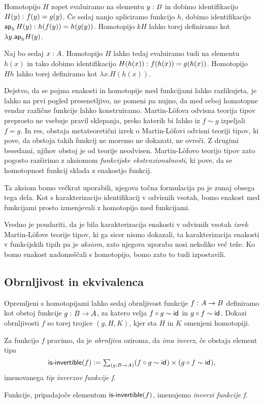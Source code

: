 \begin{dokaz}
  Homotopijo \(H\) zopet evaluiramo na elementu \(y : B\) in dobimo
  identifikacijo \(H(y) \,\colon f(y) = g(y)\). Če sedaj nanjo apliciramo funkcijo \(h\),
  dobimo identifikacijo \(\textnormal{\textsf{ap}}_{h}\,H(y) \,\colon h(f(y)) = h(g(y))\). Homotopijo \(kH\) lahko
  torej definiramo kot
  \(\lambda y. \textnormal{\textsf{ap}}_{h}H(y)\).

  Naj bo sedaj \(x : A\). Homotopijo \(H\) lahko tedaj evaluiramo tudi
  na elementu \(h(x)\) in tako dobimo identifikacijo
  \(H(h(x)) \,\colon f(h(x)) = g(h(x))\). Homotopijo \(Hh\) lahko torej definiramo kot
  \(\lambda x.H(h(x))\).
\end{dokaz}

Dejstvo, da se pojma enakosti in homotopije med funkcijami lahko razlikujeta, je lahko na prvi pogled presenetljivo, ne pomeni pa nujno, da med seboj homotopne vendar različne funkcije lahko konstruiramo. Martin-Löfova odvisna teorija tipov preprosto ne vsebuje pravil sklepanja, preko katerih bi lahko iz \(f \sim g\) izpeljali \(f = g\). In res, obstaja metateoretični izrek o Martin-Löfovi odvisni teoriji tipov, ki pove, da obstoja takih funkcij ne moremo ne dokazati, ne ovreči. Z drugimi besedami, njihov obstoj je od teorije neodvisen. Martin-Löfovo teorijo tipov zato pogosto razširimo z aksiomom \emph{funkcijske ekstenzionalnosti}, ki pove, da se homotopnost funkcij sklada z enakostjo funkcij.

Ta aksiom bomo večkrat uporabili, njegova točna formulacija pa je zunaj obsega tega dela. Kot s karakterizacijo identifikacij v odvisnih vsotah, bomo enakost med funkcijami prosto izmenjevali z homotopijo med funkcijami.

Vredno je poudariti, da je bila karakterizacija enakosti v odvisnih vsotah \emph{izrek} Martin-Löfove teorije tipov, ki ga sicer nismo dokazali, ta karakterizacija enakosti v funkcijskih tipih pa je \emph{aksiom}, zato njegova uporaba nosi nekoliko več teže. Ko bomo enakost nadomeščali s homotopijo, bomo zato to tudi izpostavili.

\subsection{Obrnljivost in ekvivalenca}
Opremljeni s homotopijami lahko sedaj obrnljivost funkcije \(f \,\colon A \to B\) definiramo kot obstoj funkcije \(g \,\colon B \to A\), za katero velja \(f \circ g \sim \textnormal{\textsf{id}}_{}\) in
\(g \circ f \sim \textnormal{\textsf{id}}_{}\). Dokazi obrnljivosti \(f\) so torej trojice \((g, H, K)\), kjer sta \(H\) in \(K\) omenjeni homotopiji.
\begin{definicija}
  Za funkcijo \(f\) pravimo, da je \emph{obrnljiva} oziroma, da \emph{ima inverz},
  če obstaja element tipa
  \[\textnormal{\textsf{is-invertible}}(f) := \textstyle \sum_{\left( g : B \to A \right)} (f \circ g \sim \textnormal{\textsf{id}}_{}) \times (g \circ f \sim \textnormal{\textsf{id}}_{}),\]
  imenovanega \emph{tip inverzov funkcije f}.

  Funkcije, pripadajoče elementom \(\textnormal{\textsf{is-invertible}}(f)\), imenujemo \emph{inverzi funkcije f}.
\end{definicija}

